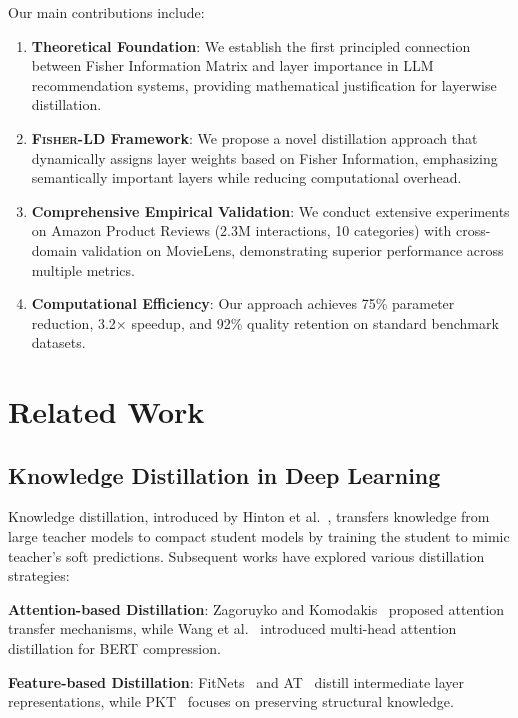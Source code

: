 \documentclass[10pt,conference]{IEEEtran}
\newcommand{\fisherld}{\textsc{Fisher-LD}}
\begin{document}
Our main contributions include:

\begin{enumerate}[leftmargin=*]
    \item \textbf{Theoretical Foundation}: We establish the first principled connection between Fisher Information Matrix and layer importance in LLM recommendation systems, providing mathematical justification for layerwise distillation.
    
    \item \textbf{\fisherld{} Framework}: We propose a novel distillation approach that dynamically assigns layer weights based on Fisher Information, emphasizing semantically important layers while reducing computational overhead.
    
    \item \textbf{Comprehensive Empirical Validation}: We conduct extensive experiments on Amazon Product Reviews (2.3M interactions, 10 categories) with cross-domain validation on MovieLens, demonstrating superior performance across multiple metrics.
    
    \item \textbf{Computational Efficiency}: Our approach achieves 75\% parameter reduction, 3.2× speedup, and 92\% quality retention on standard benchmark datasets.
\end{enumerate}

\section{Related Work}

\subsection{Knowledge Distillation in Deep Learning}

Knowledge distillation, introduced by Hinton et al.~\cite{hinton2015distilling}, transfers knowledge from large teacher models to compact student models by training the student to mimic teacher's soft predictions. Subsequent works have explored various distillation strategies:

\textbf{Attention-based Distillation}: Zagoruyko and Komodakis~\cite{zagoruyko2016attention} proposed attention transfer mechanisms, while Wang et al.~\cite{wang2020minilm} introduced multi-head attention distillation for BERT compression.

\textbf{Feature-based Distillation}: FitNets~\cite{romero2014fitnets} and AT~\cite{zagoruyko2016attention} distill intermediate layer representations, while PKT~\cite{passban2021alp} focuses on preserving structural knowledge.
\end{document}
